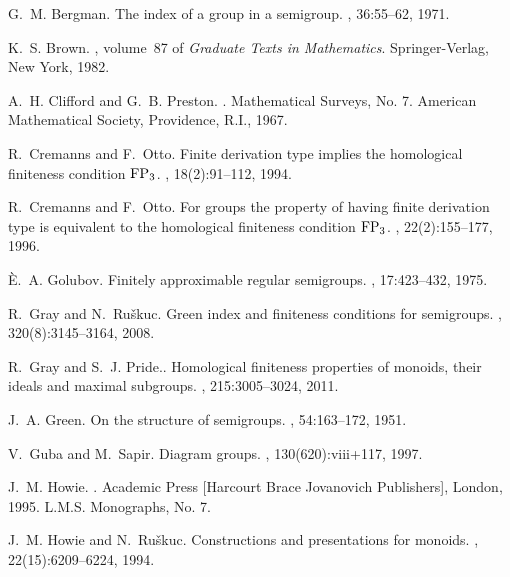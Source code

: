 \documentclass[11pt]{amsart}
\theoremstyle{plain}
\begin{document}
\begin{thebibliography}{10}

G.~M. Bergman.
\newblock The index of a group in a semigroup.
, 36:55--62, 1971.

K.~S. Brown.
, volume~87 of {\em Graduate Texts in
  Mathematics}.
\newblock Springer-Verlag, New York, 1982.

A.~H. Clifford and G.~B. Preston.
.
\newblock Mathematical Surveys, No. 7. American Mathematical Society,
  Providence, R.I., 1967.

R.~Cremanns and F.~Otto.
\newblock Finite derivation type implies the homological finiteness condition
  {${\rm FP}\sb 3$}.
, 18(2):91--112, 1994.

R.~Cremanns and F.~Otto.
\newblock For groups the property of having finite derivation type is
  equivalent to the homological finiteness condition {${\rm FP}\sb 3$}.
, 22(2):155--177, 1996.

{\`E}.~A. Golubov.
\newblock Finitely approximable regular semigroups.
, 17:423--432, 1975.

R.~Gray and N.~Ru{\v{s}}kuc.
\newblock Green index and finiteness conditions for semigroups.
, 320(8):3145--3164, 2008.

R.~Gray and S.~J. Pride..
\newblock Homological finiteness properties of monoids, their ideals and maximal subgroups.
, 215:3005--3024, 2011.

J.~A. Green.
\newblock On the structure of semigroups.
, 54:163--172, 1951.

V.~Guba and M.~Sapir.
\newblock Diagram groups.
, 130(620):viii+117, 1997.

J.~M. Howie.
.
\newblock Academic Press [Harcourt Brace Jovanovich Publishers], London, 1995.
\newblock L.M.S. Monographs, No. 7.

J.~M. Howie and N.~Ru{\v{s}}kuc.
\newblock Constructions and presentations for monoids.
, 22(15):6209--6224, 1994.


\end{thebibliography}
\end{document}
